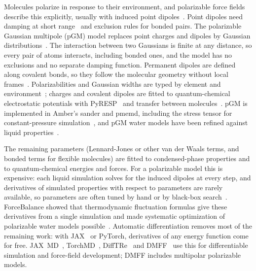 \documentclass[11pt]{article}
\begin{document}
Molecules polarize in response to their environment, and polarizable force fields describe this
explicitly, usually with induced point dipoles~\cite{ponder2010amoeba,ren2003amoebawater}. Point dipoles need
damping at short range~\cite{thole1981} and exclusion rules for bonded pairs. The polarizable
Gaussian multipole (pGM) model replaces point charges and dipoles by Gaussian
distributions~\cite{elking2007gaussian,wang2019pgm1,wei2020pgm}. The interaction between two
Gaussians is finite at any distance, so every pair of atoms interacts, including bonded ones,
and the model has no exclusions and no separate damping function. Permanent dipoles are
defined along covalent bonds, so they follow the molecular geometry without local
frames~\cite{wei2020pgm}. Polarizabilities and Gaussian widths are typed by
element and environment~\cite{wang2019pgm1}; charges and covalent dipoles are fitted to
quantum-chemical electrostatic potentials with PyRESP~\cite{zhao2022pyresp,duan2024pcmresp} and
transfer between molecules~\cite{zhao2023pgmtransfer}. pGM is implemented in Amber's sander and
pmemd, including the stress tensor for constant-pressure
simulation~\cite{wei2022pgmstress,huang2025pgmtuning,case2023ambertools}, and pGM water models have
been refined against liquid properties~\cite{wu2025pgmwater}.

The remaining parameters (Lennard-Jones or other van der Waals terms, and bonded terms for
flexible molecules) are fitted to condensed-phase properties and to quantum-chemical energies
and forces. For a polarizable model this is expensive: each liquid simulation solves for the
induced dipoles at every step, and derivatives of simulated properties with respect to
parameters are rarely available, so parameters are often tuned by hand or by black-box
search~\cite{wu2025pgmwater}. ForceBalance showed that thermodynamic fluctuation formulas give
these derivatives from a single simulation and made systematic optimization of polarizable water
models possible~\cite{wang2014forcebalance,wang2013iamoeba}. Automatic differentiation removes
most of the remaining work: with JAX~\cite{jax2018} or PyTorch, derivatives of any energy function
come for free. JAX~MD~\cite{schoenholz2020jaxmd}, TorchMD~\cite{doerr2021torchmd},
DiffTRe~\cite{thaler2021difftre} and DMFF~\cite{wang2023dmff} use this for differentiable
simulation and force-field development; DMFF includes multipolar polarizable models.
\end{document}
